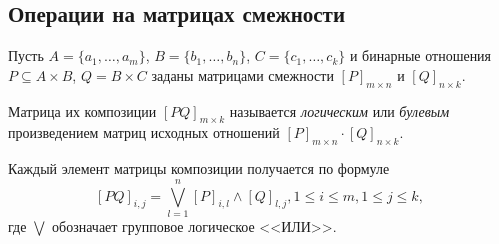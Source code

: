 \subsection{Операции на матрицах смежности}

Пусть $A=\{a_1,\ldots,a_m\}$, $B=\{b_1,\ldots,b_n\}$, $C=\{c_1,\ldots,c_k\}$ и бинарные отношения $P\subseteq A\times B$, $Q=B\times C$ заданы матрицами смежности $[P]_{m\times n}$ и $[Q]_{n\times k}$.

Матрица их композиции $[PQ]_{m\times k}$ называется \emph{логическим} или \emph{булевым} произведением матриц исходных отношений $[P]_{m\times n}\cdot [Q]_{n\times k}$.

Каждый элемент матрицы композиции получается по формуле
\[
    [PQ]_{i,j}=\bigvee_{l=1}^{n} [P]_{i,l}\land [Q]_{l,j},
    1\leq i\leq m, 1\leq j\leq k,
\]
где $\bigvee$ обозначает групповое логическое <<ИЛИ>>.

